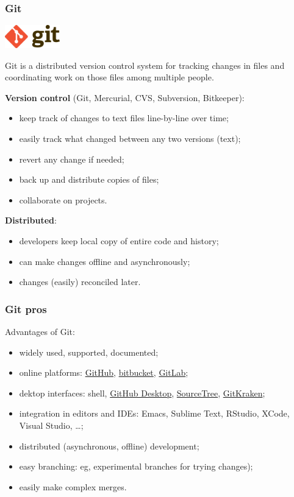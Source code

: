 \documentclass[10pt,svgnames]{beamer}
\begin{document}
\begin{frame}
\frametitle{Git}
\includegraphics[height=1cm]{Git-logo}

Git is a distributed version control system for tracking changes in files and coordinating work on those files among multiple people.
\smallskip
\pause

\textbf{Version control} (Git, Mercurial, CVS, Subversion, Bitkeeper):
\begin{itemize}
   \item keep track of changes to text files line-by-line over time;
   \item easily track what changed between any two versions (text);
   \item revert any change if needed;
   \item back up and distribute copies of files;
   \item collaborate on projects.
 \end{itemize} 
\pause
\textbf{Distributed}:
\begin{itemize}
  \item developers keep local copy of entire code and history;
  \item can make changes offline and asynchronously;
  \item changes (easily) reconciled later.
\end{itemize}
\end{frame}


\begin{frame}
\frametitle{Git pros}

Advantages of Git:
\begin{itemize}
  \item widely used, supported, documented;
  \item online platforms: \href{https://github.com/}{GitHub}, \href{https://bitbucket.org/}{bitbucket}, \href{https://about.gitlab.com/}{GitLab};
  \item dektop interfaces: shell, \href{https://desktop.github.com/}{GitHub Desktop}, \href{https://www.sourcetreeapp.com/}{SourceTree}, \href{https://www.gitkraken.com/}{GitKraken};
  \item integration in editors and IDEs: Emacs, Sublime Text, RStudio, XCode, Visual Studio, \ldots;
  \item distributed (asynchronous, offline) development;
  \item easy branching: eg, experimental branches for trying changes);
  \item easily make complex merges.
\end{itemize}
\end{frame}
\end{document}
